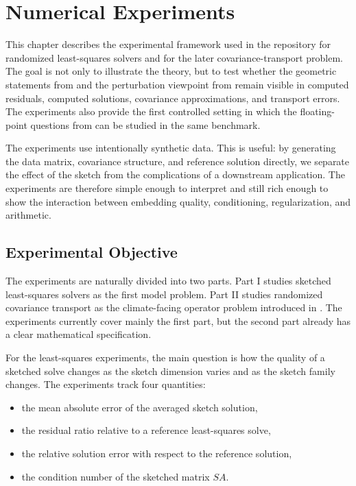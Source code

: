 \chapter{Numerical Experiments} \label{ch:experiments}

This chapter describes the experimental framework used in the repository for
randomized least-squares solvers and for the later covariance-transport problem.
The goal is not only to illustrate the theory, but to test whether the geometric
statements from  and the perturbation viewpoint from
 remain visible in computed residuals, computed
solutions, covariance approximations, and transport errors. The experiments also
provide the first controlled setting in which the floating-point questions from
 can be studied in the same benchmark.

The experiments use intentionally synthetic data. This is useful:
by generating the data matrix, covariance structure, and reference solution
directly, we separate the effect of the sketch from the complications of a
downstream application. The experiments are therefore simple enough to interpret
and still rich enough to show the interaction between embedding quality,
conditioning, regularization, and arithmetic.

\section{Experimental Objective}

The experiments are naturally divided into two parts. Part I studies sketched
least-squares solvers as the first model problem. Part II studies randomized
covariance transport as the climate-facing operator problem introduced in
. The experiments currently cover mainly the first
part, but the second part already has a clear mathematical specification.

For the least-squares experiments, the main question is how the quality of a
sketched solve changes as the sketch dimension varies and as the sketch family
changes. The experiments track four quantities:
\begin{itemize}
	\item the mean absolute error of the averaged sketch solution,
	\item the residual ratio relative to a reference least-squares solve,
	\item the relative solution error with respect to the reference solution,
	\item the condition number of the sketched matrix \(SA\).
\end{itemize}

